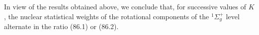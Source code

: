 In view of the results obtained above, we conclude that, for successive values of $K$, the nuclear statistical weights of the rotational components of the ${}^1\Sigma_g^+$ level alternate in the ratio (86.1) or (86.2).
